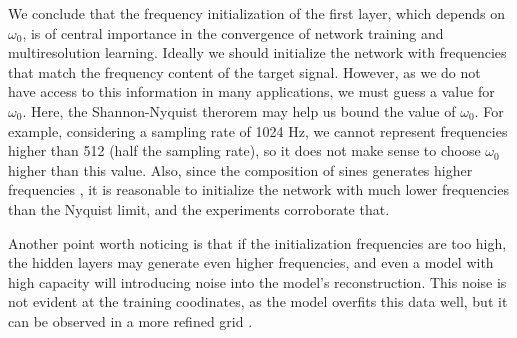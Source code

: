 



We conclude that the frequency initialization of the first layer, which depends on $\omega_0$, is of central importance in the convergence of network training and multiresolution learning. Ideally we should initialize the network with frequencies that match the frequency content of the target signal. However, as we do not have access to this information in many applications, we must guess a value for $\omega_0$. Here, the Shannon-Nyquist therorem may help us bound the value of $\omega_0$. For example, considering a sampling rate of 1024 Hz, we cannot represent frequencies higher than 512 (half the sampling rate), so it does not make sense to choose $\omega_0$ higher than this value. Also, since the composition of sines generates higher frequencies \cite{novello2022understanding}, it is reasonable to initialize the network with much lower frequencies than the Nyquist limit, and the experiments corroborate that.


Another point worth noticing is that if the initialization frequencies are too high, the hidden layers may generate even higher frequencies, and even a model with high capacity will introducing noise into the model's reconstruction. This noise is not evident at the training coodinates, as the model overfits this data well, but it can be observed in a more refined grid .


